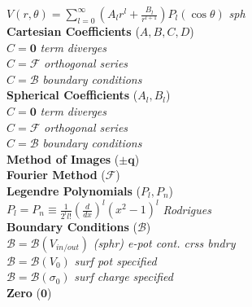 \documentclass[9pt]{extarticle}
\begin{document}
\begin{multicols}{3}
$V(r, \theta) = \sum_{l=0}^{\infty} \left(A_{l}r^{l} + \frac{B_{l}}{r^{l + 1}}\right)P_{l}(\cos{\theta})$ \textit{sph} \\
\textbf{Cartesian Coefficients} ($A, B, C, D$) \\
$C = \mathbf{0}$  \textit{term diverges} \\
$C = \mathcal{F}$ \textit{orthogonal series} \\
$C = \mathcal{B}$ \textit{boundary conditions} \\
\textbf{Spherical Coefficients} ($A_{l}, B_{l}$) \\
$C = \mathbf{0}$  \textit{term diverges} \\
$C = \mathcal{F}$ \textit{orthogonal series} \\
$C = \mathcal{B}$ \textit{boundary conditions} \\
\textbf{Method of Images} ($\pm\mathbf{q}$) \\
\textbf{Fourier Method} ($\mathcal{F}$) \\
\textbf{Legendre Polynomials} ($P_{l}, P_{n}$) \\
$P_{l} = P_{n} \equiv \frac{1}{2^{l}l!}(\frac{d}{dx})^{l}(x^{2}-1)^{l}$ \textit{Rodrigues} \\
\textbf{Boundary Conditions} ($\mathcal{B}$) \\
$\mathcal{B} = \mathcal{B}(V_{in/out})$ \textit{(sphr) e-pot cont. crss bndry} \\
$\mathcal{B} = \mathcal{B}(V_{0})$ \textit{surf pot specified} \\
$\mathcal{B} = \mathcal{B}(\sigma_{0})$ \textit{surf charge specified} \\
\textbf{Zero} ($\mathbf{0}$) \\
\end{multicols}
\pagebreak
\end{document}

